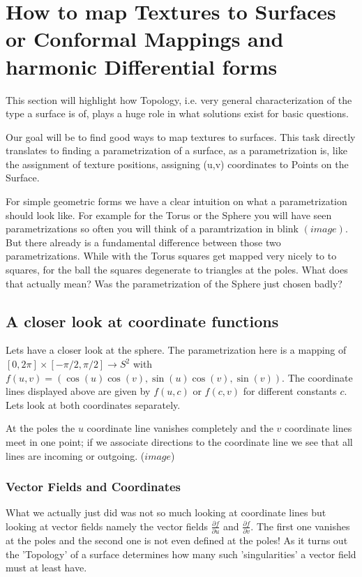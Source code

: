\chapter{How to map Textures to Surfaces or Conformal Mappings and harmonic Differential forms}
	
	This section will highlight how Topology, i.e. very general characterization of the type a surface is of, plays a huge role in what solutions exist for basic questions.

	Our goal will be to find good ways to map textures to surfaces. This task directly translates to finding a parametrization of a surface, as a parametrization is, like the assignment of texture positions, assigning (u,v) coordinates to Points on the Surface.
	
	For simple geometric forms we have a clear intuition on what a parametrization should look like. For example for the Torus or the Sphere you will have seen parametrizations so often you will think of a paramtrization in blink $(image)$. But there already is a fundamental difference between those two parametrizations. While with the Torus squares get mapped very nicely to to squares, for the ball the squares degenerate to triangles at the poles. What does that actually mean? Was the parametrization of the Sphere just chosen badly?
	
	
	\section{A closer look at coordinate functions}
	Lets have a closer look at the sphere. The parametrization here is a mapping of $[0,2\pi]\times[-\pi/2,\pi/2] \rightarrow S^2$ with $f(u,v) = (\cos(u)\cos(v), \sin(u)\cos(v), \sin(v))$. The coordinate lines displayed above are given by $f(u,c)$ or $f(c,v)$ for different constants $c$. Lets look at both coordinates separately.
	
	At the poles the $u$ coordinate line vanishes completely and the $v$ coordinate lines meet in one point; if we associate directions to the coordinate line we see that all lines are incoming or outgoing. ($image$)
	
	\subsection{Vector Fields and Coordinates}
	What we actually just did was not so much looking at coordinate lines but looking at vector fields namely the vector fields $\frac{\partial f}{\partial u}$ and $\frac{\partial f}{\partial v}$. The first one vanishes at the poles and the second one is not even defined at the poles! As it turns out the 'Topology' of a surface determines how many such 'singularities' a vector field must at least have.
	
